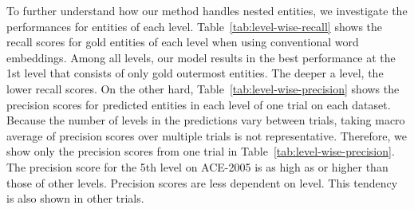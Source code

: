 \documentclass[11pt,a4paper]{article}
\def\tabref#1{Table~\ref{#1}}
\begin{document}
\begin{table}[t!]
\centering
\small
{}
\caption{Precision scores for predictions of each level of one trial.}\label{tab:level-wise-precision}
\end{table}

To further understand how our method handles nested entities, we investigate the performances for entities of each level.
\tabref{tab:level-wise-recall} shows the recall scores for gold entities of each level when using conventional word embeddings.
Among all levels, our model results in the best performance at the 1st level that consists of only gold outermost entities.
The deeper a level, the lower recall scores.
On the other hard, \tabref{tab:level-wise-precision} shows the precision scores for predicted entities in each level of one trial on each dataset.
Because the number of levels in the predictions vary between trials, taking macro average of precision scores over multiple trials is not representative.
Therefore, we show only the precision scores from one trial in \tabref{tab:level-wise-precision}.
The precision score for the 5th level on ACE-2005 is as high as or higher than those of other levels.
Precision scores are less dependent on level.
This tendency is also shown in other trials.
\end{document}
